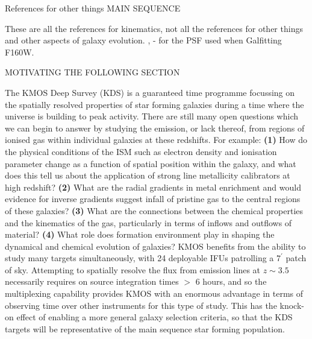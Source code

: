 \documentclass[a4paper,fleqn,usenatbib]{mn2e}
\begin{document}
References for other things
MAIN SEQUENCE
\citep{Daddi2007} \citep{Elbaz2011a} \citep{Elbaz2007} \citep{Noeske2007a}





These are all the references for kinematics, not all the references for other things and other aspects of galaxy evolution. 
\citep{Wisnioski2015} \citep{ForsterSchreiber2009} \citep{ForsterSchreiber2006} \citep{Stott2016} \citep{Gnerucci2011} \citep{Epinat2012} ,\citep{Epinat2009} \citep{Epinat2010} \citep{Lilly2013} \citep{Saintonge2013} \citep{Wisnioski2011} \citep{Wright2007} \citep{Wright2009} \citep{Genzel2008} \citep{Genzel2006} \citep{Shapiro2008} \citep{Jones2010a} \citep{Newman2013} \citep{Genel2008} \citep{Nesvadba2008} \citep{Queyrel2012} \citep{Law2007} \citep{Law2009}
\citep{Simons2016} \citep{Pelliccia2016} \citep{Genzel2011} \citep{Epinat2008} \citep{Epinat2008a} \citep{Puech2008} \citep{Puech2007} \cite{Holmberg1958} \citep{Kassin2012} \citep{Flores2006} \citep{Neichel2008} \citep{Miller2011} \citep{Nesvadba2006} \citep{Nesvadba2007} \citep{Livermore2015} \citep{Swinbank2006} \citep{Swinbank2007} \citep{Swinbank2009} \citep{Cortese2014} \citep{VanderWel2012} \citep{Genzel2014a} \citep{Genzel2014} - for the PSF used when Galfitting F160W. \citep{Rodriguez-Gomez2016} \citep{Qu2016}



MOTIVATING THE FOLLOWING SECTION

The KMOS Deep Survey (KDS) is a guaranteed time programme focussing on the spatially resolved properties of star forming galaxies during a time where the universe is building to peak activity.
There are still many open questions which we can begin to answer by studying the emission, or lack thereof, from regions of ionised gas within individual galaxies at these redshifts.
For example: \textbf{(1)} How do the physical conditions of the ISM such as electron density and ionisation parameter change as a function of spatial position within the galaxy, and what does this tell us about the application of strong line metallicity calibrators at high redshift?
\textbf{(2)} What are the radial gradients in metal enrichment and would evidence for inverse gradients suggest infall of pristine gas to the central regions of these galaxies?
\textbf{(3)} What are the connections between the chemical properties and the kinematics of the gas, particularly in terms of inflows and outflows of material?
\textbf{(4)} What role does formation environment play in shaping the dynamical and chemical evolution of galaxies? 
KMOS benefits from the ability to study many targets simultaneously, with 24 deployable IFUs patrolling a $7^{\prime}$ patch of sky.
Attempting to spatially resolve the flux from emission lines at $z \sim 3.5$ necessarily requires on source integration times $>$ 6 hours, and so the multiplexing capability provides KMOS with an enormous advantage in terms of observing time over other instruments for this type of study.
This has the knock-on effect of enabling a more general galaxy selection criteria, so that the KDS targets will be representative of the main sequence star forming population. 
\end{document}
